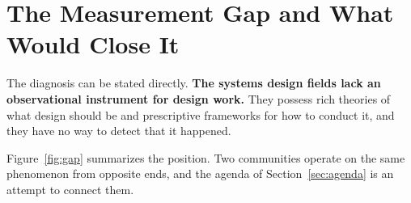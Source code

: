 \documentclass{csimq}
\begin{document}
\section{The Measurement Gap and What Would Close It}
\label{sec:gap}

The diagnosis can be stated directly. \textbf{The systems design fields lack an
observational instrument for design work.} They possess rich theories of what
design should be and prescriptive frameworks for how to conduct it, and they
have no way to detect that it happened.

Figure~\ref{fig:gap} summarizes the position. Two communities operate on the
same phenomenon from opposite ends, and the agenda of
Section~\ref{sec:agenda} is an attempt to connect them.
\end{document}
